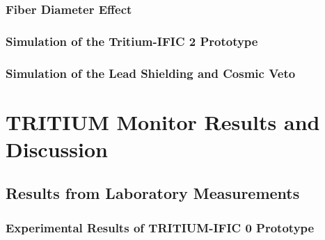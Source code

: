 \documentclass[12pt,a4paper]{book}
\begin{document}
		\subsection[Fiber Diameter]{Fiber Diameter Effect}\label{subsec:FiberDiameterSimulation}
		
		
		\subsection[Tritium-IFIC 2]{Simulation of the Tritium-IFIC 2 Prototype}\label{subsec:TritiumIFIC2Simulation}
		
		
		\subsection[Lead Shielding and Cosmic Veto]{Simulation of the Lead Shielding and Cosmic Veto}\label{subsec:LeadCosmicSimulation}
		
		\newpage
				
\chapter{TRITIUM Monitor Results and Discussion}\label{chap:ResultsPrototypes}
	
	
	\section{Results from Laboratory Measurements}\label{sec:ResultsLaboratoryPrototypes}
	
		
		\subsection[Experimental Results of TRITIUM-IFIC 0]{Experimental Results of TRITIUM-IFIC 0 Prototype}\label{subsec:ResultsTritiumIFIC0}
		
		
\end{document}
